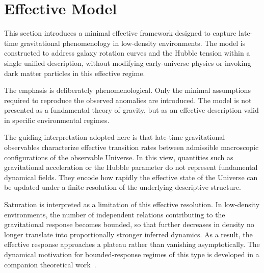 \section{Effective Model}
  \label{sec:effective_model}

  This section introduces a minimal effective framework designed to capture
  late-time gravitational phenomenology in low-density environments.
  The model is constructed to address galaxy rotation curves and the Hubble
  tension within a single unified description,
  without modifying early-universe physics or invoking dark matter particles in this effective regime.

  The emphasis is deliberately phenomenological.
  Only the minimal assumptions required to reproduce the observed anomalies are introduced.
  The model is not presented as a fundamental theory of gravity,
  but as an effective description valid in specific environmental regimes.

  The guiding interpretation adopted here is that late-time gravitational
  observables characterize effective transition rates between admissible
  macroscopic configurations of the observable Universe.
  In this view, quantities such as gravitational acceleration or the Hubble
  parameter do not represent fundamental dynamical fields.
  They encode how rapidly the effective state of the Universe can be updated
  under a finite resolution of the underlying descriptive structure.

  Saturation is interpreted as a limitation of this effective resolution.
  In low-density environments, the number of independent relations contributing
  to the gravitational response becomes bounded,
  so that further decreases in density no longer translate into proportionally stronger inferred dynamics.
  As a result, the effective response approaches a plateau rather than vanishing asymptotically.
  The dynamical motivation for bounded-response regimes of this type is developed
  in a companion theoretical work~\cite{Beau2026c}.

  
  
  
  
  
  
